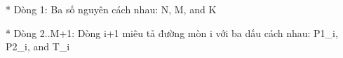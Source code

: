 * Dòng 1: Ba số nguyên cách nhau: N, M, and K  

   * Dòng 2..M+1: Dòng i+1 miêu tả đường mòn i với ba dấu cách nhau: P1\_i, P2\_i, and T\_i  

\